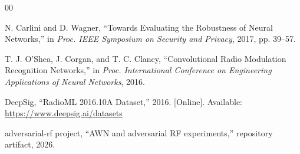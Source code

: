 \begin{thebibliography}{00}

N. Carlini and D. Wagner, ``Towards Evaluating the Robustness of Neural Networks,''
in \emph{Proc. IEEE Symposium on Security and Privacy}, 2017, pp. 39--57.

T. J. O'Shea, J. Corgan, and T. C. Clancy,
``Convolutional Radio Modulation Recognition Networks,''
in \emph{Proc. International Conference on Engineering Applications of Neural Networks},
2016.

DeepSig, ``RadioML 2016.10A Dataset,'' 2016. [Online]. Available:
\url{https://www.deepsig.ai/datasets}

adversarial-rf project, ``AWN and adversarial RF experiments,''
repository artifact, 2026.

\end{thebibliography}
